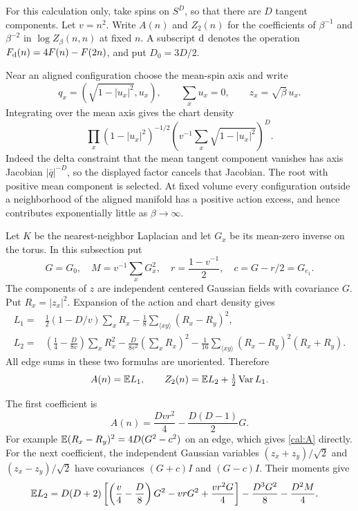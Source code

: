 For this calculation only, take spins on $S^D$, so that there are $D$
tangent components. Let $v=n^2$. Write $A(n)$ and $Z_2(n)$ for the
coefficients of $\beta^{-1}$ and $\beta^{-2}$ in $\log Z_\beta(n,n)$ at
fixed $n$. A subscript ${\rm d}$ denotes the operation
$F_{\rm d}(n)=4F(n)-F(2n)$, and put $D_0=3D/2$.

Near an aligned configuration choose the mean-spin axis and write
\[
 q_x=(\sqrt{1-|u_x|^2},u_x),\qquad \sum_xu_x=0,
 \qquad z_x=\sqrt\beta\,u_x.
\]
Integrating over the mean axis gives the chart density
\[
 \prod_x(1-|u_x|^2)^{-1/2}
 \left(v^{-1}\sum_x\sqrt{1-|u_x|^2}\right)^D.
\]
Indeed the delta constraint that the mean tangent component vanishes
has axis Jacobian $|\bar q|^{-D}$, so the displayed factor cancels that
Jacobian. The root with positive mean component is selected. At fixed
volume every configuration outside a neighborhood of the aligned
manifold has a positive action excess, and hence contributes
exponentially little as $\beta\to\infty$.

Let $K$ be the nearest-neighbor Laplacian and let $G_x$ be its mean-zero
inverse on the torus. In this subsection put
\[
 G=G_0,\quad M=v^{-1}\sum_xG_x^2,\quad
 r=\frac{1-v^{-1}}2,\quad c=G-r/2=G_{e_1}.
\]
The components of $z$ are independent centered Gaussian fields with
covariance $G$. Put $R_x=|z_x|^2$. Expansion of the action and chart
density gives
\begin{align}
 L_1={}&\frac12(1-D/v)\sum_xR_x
             -\frac18\sum_{\langle xy\rangle}(R_x-R_y)^2,
 \label{cal:L1}\\
 L_2={}&\left(\frac14-\frac D{8v}\right)\sum_xR_x^2
       -\frac D{8v^2}\left(\sum_xR_x\right)^2
       -\frac1{16}\sum_{\langle xy\rangle}
                  (R_x-R_y)^2(R_x+R_y).
 \label{cal:L2}
\end{align}
All edge sums in these two formulas are unoriented. Therefore
\[
 A(n)=\mathbb E L_1,\qquad
 Z_2(n)=\mathbb E L_2+\tfrac12\operatorname{Var}L_1.
\]

The first coefficient is
\begin{equation}
\label{cal:A}
 A(n)=\frac{Dv r^2}{4}-\frac{D(D-1)}2G.
\end{equation}
For example $\mathbb E(R_x-R_y)^2=4D(G^2-c^2)$ on an edge, which gives
\eqref{cal:A} directly. For the next coefficient, the independent
Gaussian variables $(z_x+z_y)/\sqrt2$ and $(z_x-z_y)/\sqrt2$ have
covariances $(G+c)I$ and $(G-c)I$. Their moments give
\begin{align}
 \mathbb E L_2={}&D(D+2)
 \left[\left(\frac v4-\frac D8\right)G^2-vrG^2+\frac{vr^2G}{4}\right]
       -\frac{D^3G^2}{8}-\frac{D^2M}{4}.
 \label{cal:EL2}
\end{align}

